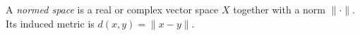 
A \emph{normed space} is a real or complex vector space $X$ together with a norm $\|\cdot\|$. Its induced metric is $d(x,y)=\|x-y\|$.
